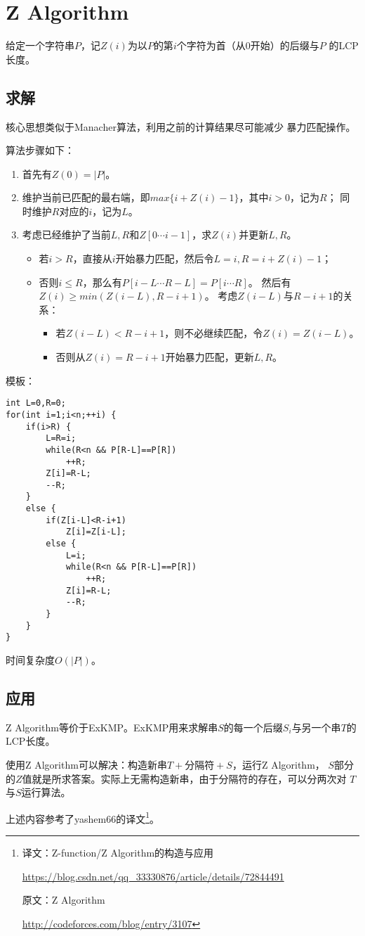 \section{Z Algorithm}
\label{ZA}
给定一个字符串$P$，记$Z(i)$为以$P$的第$i$个字符为首（从0开始）的后缀与$P$
的LCP长度。
\subsection{求解}
核心思想类似于Manacher算法，利用之前的计算结果尽可能减少
暴力匹配操作。

算法步骤如下：
\begin{enumerate}
    \item 首先有$Z(0)=|P|$。
    \item 维护当前已匹配的最右端，即$max\{i+Z(i)-1\}$，其中$i>0$，记为$R$；
    同时维护$R$对应的$i$，记为$L$。
    \item 考虑已经维护了当前$L,R$和$Z[0\cdots i-1]$，求$Z(i)$并更新$L,R$。
    \begin{itemize}
        \item 若$i>R$，直接从$i$开始暴力匹配，然后令$L=i,R=i+Z(i)-1$；
        \item 否则$i\leq R$，那么有$P[i-L\cdots R-L]=P[i\cdots R]$。
        然后有$Z(i)\geq min(Z(i-L),R-i+1)$。
        考虑$Z(i-L)$与$R-i+1$的关系：
        \begin{itemize}
            \item 若$Z(i-L)<R-i+1$，则不必继续匹配，令$Z(i)=Z(i-L)$。
            \item 否则从$Z(i)=R-i+1$开始暴力匹配，更新$L,R$。
        \end{itemize}
    \end{itemize}
\end{enumerate}

模板：
\begin{lstlisting}
int L=0,R=0;
for(int i=1;i<n;++i) {
    if(i>R) {
        L=R=i;
        while(R<n && P[R-L]==P[R])
            ++R;
        Z[i]=R-L;
        --R;
    }
    else {
        if(Z[i-L]<R-i+1)
            Z[i]=Z[i-L];
        else {
            L=i;
            while(R<n && P[R-L]==P[R])
                ++R;
            Z[i]=R-L;
            --R;
        }
    }
}
\end{lstlisting}

时间复杂度$O(|P|)$。
\subsection{应用}
Z Algorithm等价于ExKMP。ExKMP用来求解串$S$的每一个后缀$S_i$与另一个串$T$的
LCP长度。

使用Z Algorithm可以解决：构造新串$T+\textrm{分隔符}+S$，运行Z Algorithm，
$S$部分的$Z$值就是所求答案。实际上无需构造新串，由于分隔符的存在，可以分两次对
$T$与$S$运行算法。

上述内容参考了yashem66的译文\footnote{
    译文：Z-function/Z Algorithm的构造与应用

    \url{https://blog.csdn.net/qq\_33330876/article/details/72844491}

    原文：Z Algorithm

    \url{http://codeforces.com/blog/entry/3107}
}。
